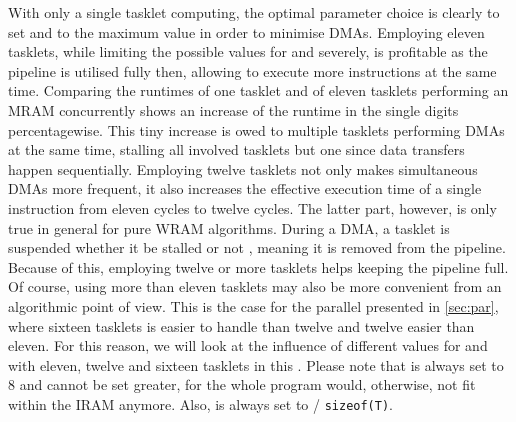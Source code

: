 



With only a single tasklet computing, the optimal parameter choice is clearly to set \cachesize{} and \seqreadcachesize{} to the maximum value in order to minimise DMAs.
Employing eleven tasklets, while limiting the possible values for \cachesize{} and \seqreadcachesize{} severely, is profitable as the pipeline is utilised fully then, allowing to execute more instructions at the same time.
Comparing the runtimes of one tasklet and of eleven tasklets performing an MRAM \MS{} concurrently shows an increase of the runtime in the single digits percentagewise.
This tiny increase is owed to multiple tasklets performing DMAs at the same time, stalling all involved tasklets but one since data transfers happen sequentially.
Employing twelve tasklets not only makes simultaneous DMAs more frequent, it also increases the effective execution time of a single instruction from eleven cycles to twelve cycles.
The latter part, however, is only true in general for pure WRAM algorithms.
During a DMA, a tasklet is suspended \Dash whether it be stalled or not \Dash\!, meaning it is removed from the pipeline.
Because of this, employing twelve or more tasklets helps keeping the pipeline full.
Of course, using more than eleven tasklets may also be more convenient from an algorithmic point of view.
This is the case for the parallel \MS{} presented in \cref{sec:par}, where sixteen tasklets is easier to handle than twelve and twelve easier than eleven.
For this reason, we will look at the influence of different values for \cachesize{} and \seqreadcachesize{} with eleven, twelve and sixteen tasklets in this .
Please note that \unrollfactor{} is always set to 8 and cannot be set greater, for the whole program would, otherwise, not fit within the IRAM anymore.
Also, \unrolledcachelength{} is always set to \cachesize{} / \lstinline[keywords={}]|sizeof(T)|.

